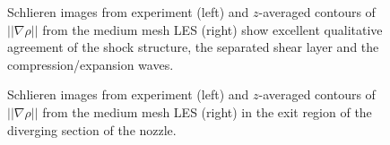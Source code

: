 \documentclass[]{aiaa-tc}%
\begin{document}

\begin{figure}[!h]%
	\begin{center}
	\end{center}
 	\caption{Schlieren images from experiment \cite{Papam:10} (left) and $z$-averaged contours of $||\nabla\rho||$ from the medium mesh LES (right) show excellent qualitative agreement of the shock structure, the separated shear layer and the compression/expansion waves.  }
 	\label{fig:schl}
\end{figure}


\begin{figure}[!h]%
	\begin{center}
	\end{center}
 	\caption{Schlieren images from experiment \cite{Papam:10} (left) and $z$-averaged contours of $||\nabla\rho||$ from the medium mesh LES (right) in the exit region of the diverging section of the nozzle.  }
 	\label{fig:schl_ex}
\end{figure}
\end{document}
